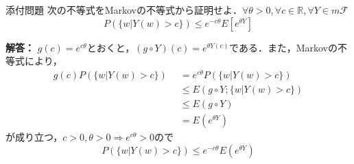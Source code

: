 \documentclass{jsarticle}
\begin{document}
\begin{itembox}[l]{添付問題}
次の不等式をMarkovの不等式から証明せよ．$\forall \theta >0, \forall c \in \mathbb{R}, \forall Y \in m\mathcal{F}$
\begin{equation*}
P(\{w|Y(w)>c\}) \le e^{-c\theta}E[e^{\theta Y}]
\end{equation*}
\end{itembox}
{\bf 解答：}
$g(c)=e^{c\theta}$とおくと，$(g \circ Y)(c) = e^{\theta Y(c)}$である．また，Markovの不等式により，
\begin{equation}
\begin{split}
g(c)P(\{w|Y(w) > c\}) &\,\,\,= e^{c\theta}P(\{w|Y(w) > c\})\\
&\,\,\, \le E(g \circ Y; \{ w|Y(w) > c \})\\
&\,\,\, \le E(g \circ Y) \\
&\,\,\, = E(e^{\theta Y})
\end{split}
\end{equation}
が成り立つ，$c>0,\theta>0 \Rightarrow e^{c\theta}>0$ので
\begin{equation}
P(\{w|Y(w) > c\})  \le e^{-c\theta}E(e^{\theta Y})
\end{equation}
\end{document}
